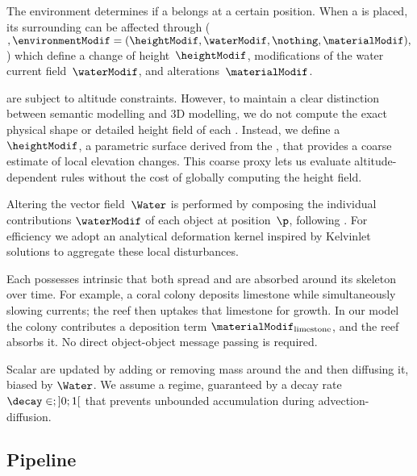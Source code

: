 \subsection{}

The environment determines if a  belongs at a certain position.
When a  is placed, its surrounding  can be affected through  ($,\environmentModif = (\heightModif, \waterModif, \nothing, \materialModif),$) which define a change of height~$\heightModif$, modifications of the water current field~$\waterModif$, and  alterations~$\materialModif$.

 are subject to altitude constraints.
However, to maintain a clear distinction between semantic modelling and 3D modelling, we do not compute the exact physical shape or detailed height field of each .
Instead, we define a ~$\heightModif$, a parametric surface derived from the , that provides a coarse estimate of local elevation changes. This coarse proxy lets us evaluate altitude-dependent rules without the cost of globally computing the height field.

Altering the vector field~$\Water$ is performed by composing the individual contributions $\waterModif$ of each object at position~$\p$, following \cite{Wejchert1991}. For efficiency we adopt an analytical deformation kernel inspired by Kelvinlet solutions \cite{DeGoes2017} to aggregate these local disturbances.

Each  possesses intrinsic  that both spread and are absorbed around its skeleton over time. For example, a coral colony deposits limestone while simultaneously slowing currents; the reef then uptakes that limestone for growth.
In our model the colony contributes a deposition term $\materialModif_{\text{limestone}}$, and the reef absorbs it. No direct object-object message passing is required.

Scalar  are updated by adding or removing mass around the  and then diffusing it, biased by $\Water$.
We assume a  regime, guaranteed by a decay rate~$\decay \in;]0; 1[$ that prevents unbounded accumulation during advection-diffusion.

\subsection{Pipeline}


